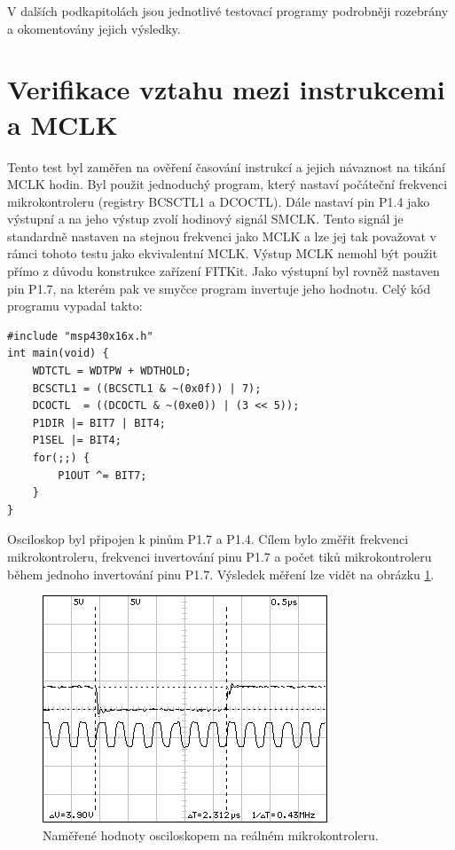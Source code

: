 V dalších podkapitolách jsou jednotlivé testovací programy podrobněji rozebrány a okomentovány jejich výsledky.

\section{Verifikace vztahu mezi instrukcemi a MCLK}

Tento test byl zaměřen na ověření časování instrukcí a jejich návaznost na tikání MCLK hodin. Byl použit jednoduchý program, který nastaví počáteční frekvenci mikrokontroleru (registry BCSCTL1 a DCOCTL). Dále nastaví pin P1.4 jako výstupní a na jeho výstup zvolí hodinový signál SMCLK. Tento signál je standardně nastaven na stejnou frekvenci jako MCLK a lze jej tak považovat v rámci tohoto testu jako ekvivalentní MCLK. Výstup MCLK nemohl být použit přímo z důvodu konstrukce zařízení FITKit. Jako výstupní byl rovněž nastaven pin P1.7, na kterém pak ve smyčce program invertuje jeho hodnotu. Celý kód programu vypadal takto:

\lstset{language=XML, numbers=left, frame=single, breaklines=true, tabsize=2, xleftmargin=20pt}
\begin{lstlisting}
#include "msp430x16x.h"
int main(void) {
	WDTCTL = WDTPW + WDTHOLD;
	BCSCTL1 = ((BCSCTL1 & ~(0x0f)) | 7);
	DCOCTL  = ((DCOCTL & ~(0xe0)) | (3 << 5));
	P1DIR |= BIT7 | BIT4;
	P1SEL |= BIT4;
	for(;;) {
		P1OUT ^= BIT7;
	}
}
\end{lstlisting}

Osciloskop byl připojen k pinům P1.7 a P1.4. Cílem bylo změřit frekvenci mikrokontroleru, frekvenci invertování pinu P1.7 a počet tiků mikrokontroleru během jednoho invertování pinu P1.7. Výsledek měření lze vidět na obrázku \ref{fig:dso04osc}.

\begin{figure}[ht]
\centering
\includegraphics[trim=0cm 0cm 0cm 0cm, scale=1]{fig/dso04}
\caption{Naměřené hodnoty osciloskopem na reálném mikrokontroleru.}
\label{fig:dso04osc}
\end{figure}

